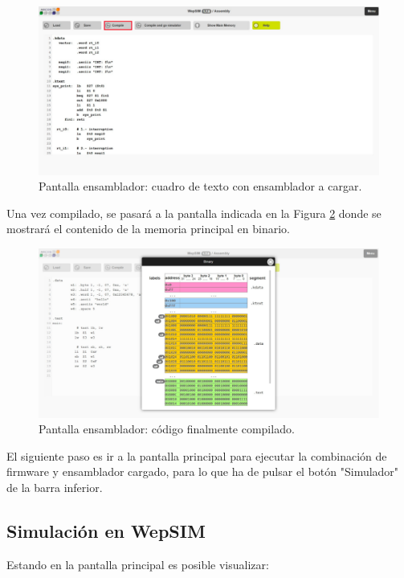 \begin{figure}[htbp]
 	\centering
 	\includegraphics[width=15cm]{figures/anexob-5}
 	\caption{Pantalla ensamblador: cuadro de texto con ensamblador a cargar.}
	\label{fig:anexob-5}
\end{figure}

Una vez compilado, se pasará a la pantalla indicada en la Figura \ref{fig:anexob-6} donde se mostrará el contenido de la memoria principal en binario.

\begin{figure}[htbp]
 	\centering
 	\includegraphics[width=15cm]{figures/anexob-6}
 	\caption{Pantalla ensamblador: código finalmente compilado.}
	\label{fig:anexob-6}
\end{figure}
El siguiente paso es ir a la pantalla principal para ejecutar la combinación de firmware y ensamblador cargado, para lo que ha de pulsar el botón "Simulador" de la barra inferior.

\subsection*{Simulación en WepSIM}
\label{ch:anexob_simulacion}

Estando en la pantalla principal es posible visualizar:

